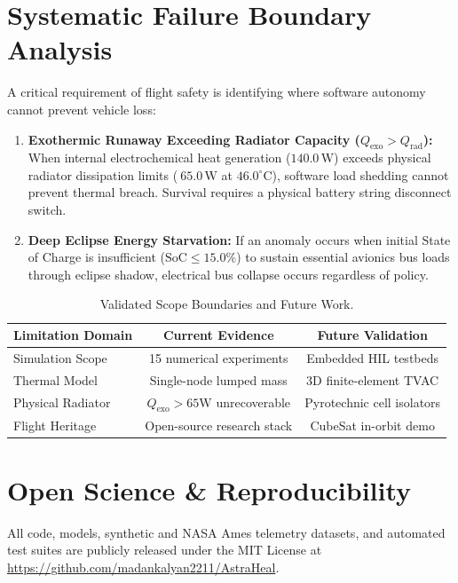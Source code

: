 \documentclass[conference]{IEEEtran}
\begin{document}
\section{Systematic Failure Boundary Analysis}
A critical requirement of flight safety is identifying where software autonomy cannot prevent vehicle loss:
\begin{enumerate}
    \item \textbf{Exothermic Runaway Exceeding Radiator Capacity ($Q_{\text{exo}} > Q_{\text{rad}}$):} When internal electrochemical heat generation ($140.0\,\text{W}$) exceeds physical radiator dissipation limits ($~65.0\,\text{W}$ at $46.0^\circ\text{C}$), software load shedding cannot prevent thermal breach. Survival requires a physical battery string disconnect switch.
    \item \textbf{Deep Eclipse Energy Starvation:} If an anomaly occurs when initial State of Charge is insufficient ($\text{SoC} \le 15.0\%$) to sustain essential avionics bus loads through eclipse shadow, electrical bus collapse occurs regardless of policy.
\end{enumerate}

\begin{table}[t]
\centering
\caption{Validated Scope Boundaries and Future Work.}
\label{tab:scope}
\small
\setlength{\tabcolsep}{5pt}
\renewcommand{\arraystretch}{1.15}
\begin{tabular}{lcc}
\toprule
\textbf{Limitation Domain} & \textbf{Current Evidence} & \textbf{Future Validation} \\
\midrule
Simulation Scope & 15 numerical experiments & Embedded HIL testbeds \\
Thermal Model & Single-node lumped mass & 3D finite-element TVAC \\
Physical Radiator & $Q_{\text{exo}} > 65\text{W}$ unrecoverable & Pyrotechnic cell isolators \\
Flight Heritage & Open-source research stack & CubeSat in-orbit demo \\
\bottomrule
\end{tabular}
\end{table}

\section{Open Science \& Reproducibility}
All code, models, synthetic and NASA Ames telemetry datasets, and automated test suites are publicly released under the MIT License at \url{https://github.com/madankalyan2211/AstraHeal}.
\end{document}
